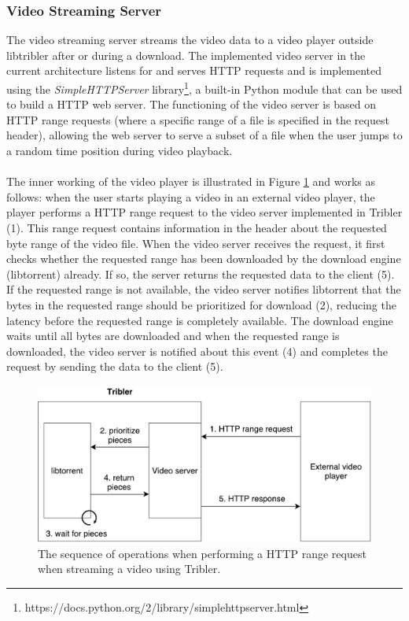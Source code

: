 \subsubsection{\textbf{Video Streaming Server}}
\label{subsubsec:video-server}
The video streaming server streams the video data to a video player outside libtribler after or during a download. The implemented video server in the current architecture listens for and serves HTTP requests and is implemented using the \emph{SimpleHTTPServer} library\footnote{https://docs.python.org/2/library/simplehttpserver.html}, a built-in Python module that can be used to build a HTTP web server. The functioning of the video server is based on HTTP range requests (where a specific range of a file is specified in the request header), allowing the web server to serve a subset of a file when the user jumps to a random time position during video playback.\\\\
The inner working of the video player is illustrated in Figure \ref{fig:video-server} and works as follows: when the user starts playing a video in an external video player, the player performs a HTTP range request to the video server implemented in Tribler (1). This range request contains information in the header about the requested byte range of the video file. When the video server receives the request, it first checks whether the requested range has been downloaded by the download engine (libtorrent) already. If so, the server returns the requested data to the client (5). If the requested range is not available, the video server notifies libtorrent that the bytes in the requested range should be prioritized for download (2), reducing the latency before the requested range is completely available. The download engine waits until all bytes are downloaded and when the requested range is downloaded, the video server is notified about this event (4) and  completes the request by sending the data to the client (5).\\

\begin{figure}[h!]
	\centering
	\includegraphics[width=0.7\columnwidth]{images/architecture/video_server}
	\caption{The sequence of operations when performing a HTTP range request when streaming a video using Tribler.}
	\label{fig:video-server}
\end{figure}

